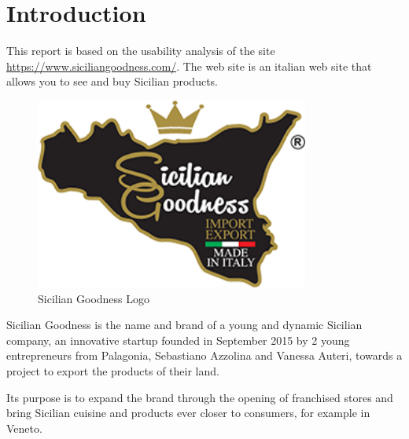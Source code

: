 \section{Introduction}

This report is based on the usability analysis of the site \url{https://www.siciliangoodness.com/}.
The web site is an italian web site that allows you to see and buy Sicilian products. \newline

	\begin{figure}[H]
	\centering\includegraphics[width=9cm]{Img/logo.jpg}
	\caption{Sicilian Goodness Logo}
	\end{figure}

Sicilian Goodness is the name and brand of a young and dynamic Sicilian company, an innovative startup founded in September 2015 by 2 young entrepreneurs from Palagonia, Sebastiano Azzolina and Vanessa Auteri, towards a project to export the products of their land. \newline 

Its purpose is to expand the brand through the opening of franchised stores and bring Sicilian cuisine and products ever closer to consumers, for example in Veneto. \\


\pagebreak
